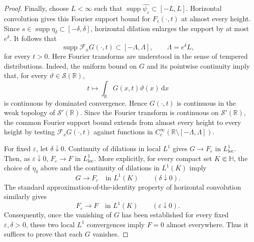\documentclass[10pt,a4paper]{amsart}
\newcommand{\dd}{\,\mathrm d}
\begin{document}
\begin{proof}
Finally, choose $L<\infty$ such that
$\operatorname{supp}\widehat{\psi_\varepsilon}\subset[-L,L]$.
Horizontal convolution gives this Fourier support bound for
$F_\varepsilon(\cdot,t)$ at almost every height.
Since $s\in\operatorname{supp}\eta_\delta\subset[-\delta,\delta]$,
horizontal dilation enlarges the support by at most $e^\delta$.
It follows that
\[
\operatorname{supp}\mathcal F_xG(\cdot,t)
\subset[-\Lambda,\Lambda],
\qquad \Lambda=e^\delta L,
\]
for every $t>0$. Here Fourier transforms are understood in
the sense of tempered distributions. Indeed, the uniform bound on $G$ and its pointwise continuity
imply that, for every $\vartheta\in\mathcal S(\mathbb R)$,
\[
t\longmapsto
\int_{\mathbb R}G(x,t)\vartheta(x)\dd x
\]
is continuous by dominated convergence. Hence
$G(\cdot,t)$ is continuous in the weak topology of
$\mathcal S'(\mathbb R)$. Since the Fourier transform is continuous
on $\mathcal S'(\mathbb R)$, the common Fourier support bound
extends from almost every height to every height by testing
$\mathcal F_xG(\cdot,t)$ against functions in
$C_c^\infty(\mathbb R\setminus[-\Lambda,\Lambda])$.

For fixed $\varepsilon$, let $\delta\downarrow0$. Continuity of dilations in local $L^1$ gives
$G\to F_\varepsilon$ in $L^1_{\mathrm{loc}}$. Then, as $\varepsilon\downarrow0$,
$F_\varepsilon\to F$ in $L^1_{\mathrm{loc}}$.
More explicitly, for every compact set $K\Subset\mathbb H$, the choice of
$\eta_\delta$ above and the continuity of dilations in $L^1(K)$ imply
\[
G\longrightarrow F_\varepsilon\quad\text{in }L^1(K)\qquad(\delta\downarrow0).
\]
The standard approximation-of-the-identity property of horizontal convolution
similarly gives
\[
F_\varepsilon\longrightarrow F\quad\text{in }L^1(K)\qquad(\varepsilon\downarrow0).
\]
Consequently, once the vanishing of $G$ has been established for every fixed
$\varepsilon,\delta>0$, these two local $L^1$ convergences imply $F=0$ almost everywhere.
Thus it suffices to prove that each $G$ vanishes.


\end{proof}
\end{document}
